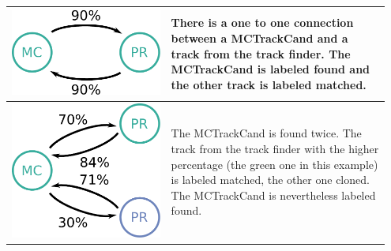 \begin{table}
  \begin{tabular}{m{0.4\linewidth}m{0.55\linewidth}} \toprule
    \centering \includegraphics[width=0.8\linewidth]{figures/theory/fom_found.pdf} & There is a one to one connection between a MCTrackCand and a track from the track finder. The MCTrackCand is labeled found and the other track is labeled matched. \\ \midrule
    \centering \includegraphics[width=0.8\linewidth]{figures/theory/fom_clone.pdf} & The MCTrackCand is found twice. The track from the track finder with the higher percentage (the green one in this example) is labeled matched, the other one cloned. The MCTrackCand is nevertheless labeled found. \\  \midrule

\end{tabular}
\end{table}
